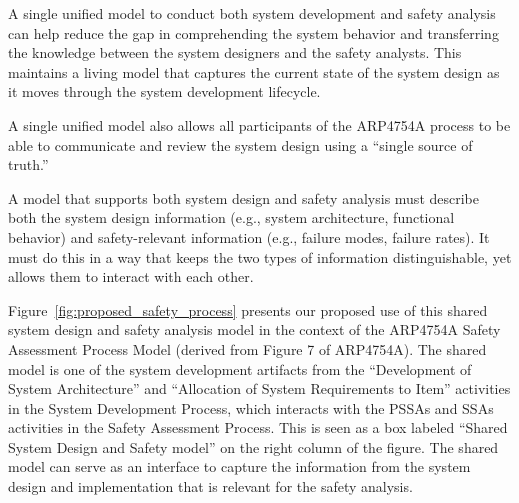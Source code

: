 A single unified model to conduct both system development and safety analysis can help reduce the gap in comprehending the system behavior and transferring the knowledge between the system designers and the safety analysts. This maintains a living model that captures the current state of the system design as it moves through the system development lifecycle.

A single unified model also allows all participants of the ARP4754A process to be able to communicate and review the system design using a ``single source of truth.''

A model that supports both system design and safety analysis must describe both the system design information (e.g., system architecture, functional behavior) and safety-relevant information (e.g., failure modes, failure rates).  It must do this in a way that keeps the two types of information distinguishable, yet allows them to interact with each other.

Figure~\ref{fig:proposed_safety_process} presents our proposed use of this shared system design and safety analysis model in the context of the ARP4754A Safety Assessment Process Model (derived from Figure 7 of ARP4754A). The shared model is one of the system development artifacts from the ``Development of System Architecture'' and ``Allocation of System Requirements to Item'' activities in the System Development Process, which interacts with the PSSAs and SSAs activities in the Safety Assessment Process. This is seen as a box labeled ``Shared System Design and Safety model'' on the right column of the figure. The shared model can serve as an interface to capture the information from the system design and implementation that is relevant for the safety analysis.



